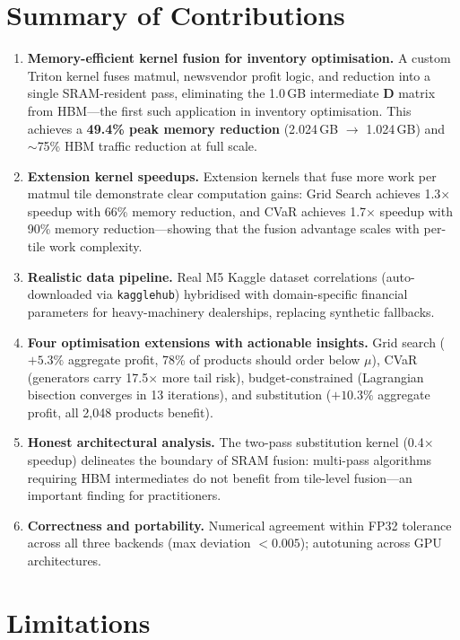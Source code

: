 \section{Summary of Contributions}

\begin{enumerate}
    \item \textbf{Memory-efficient kernel fusion for inventory optimisation.} A custom Triton kernel fuses matmul, newsvendor profit logic, and reduction into a single SRAM-resident pass, eliminating the 1.0\,GB intermediate $\mathbf{D}$ matrix from HBM---the first such application in inventory optimisation. This achieves a \textbf{49.4\% peak memory reduction} (2.024\,GB $\to$ 1.024\,GB) and ${\sim}$75\% HBM traffic reduction at full scale.
    \item \textbf{Extension kernel speedups.} Extension kernels that fuse more work per matmul tile demonstrate clear computation gains: Grid Search achieves 1.3$\times$ speedup with 66\% memory reduction, and CVaR achieves 1.7$\times$ speedup with 90\% memory reduction---showing that the fusion advantage scales with per-tile work complexity.
    \item \textbf{Realistic data pipeline.} Real M5 Kaggle dataset correlations (auto-downloaded via \texttt{kagglehub}) hybridised with domain-specific financial parameters for heavy-machinery dealerships, replacing synthetic fallbacks.
    \item \textbf{Four optimisation extensions with actionable insights.} Grid search ($+5.3\%$ aggregate profit, 78\% of products should order below $\mu$), CVaR (generators carry 17.5$\times$ more tail risk), budget-constrained (Lagrangian bisection converges in 13 iterations), and substitution ($+10.3\%$ aggregate profit, all 2,048 products benefit).
    \item \textbf{Honest architectural analysis.} The two-pass substitution kernel (0.4$\times$ speedup) delineates the boundary of SRAM fusion: multi-pass algorithms requiring HBM intermediates do not benefit from tile-level fusion---an important finding for practitioners.
    \item \textbf{Correctness and portability.} Numerical agreement within FP32 tolerance across all three backends (max deviation $< 0.005$); autotuning across GPU architectures.
\end{enumerate}

\section{Limitations}

